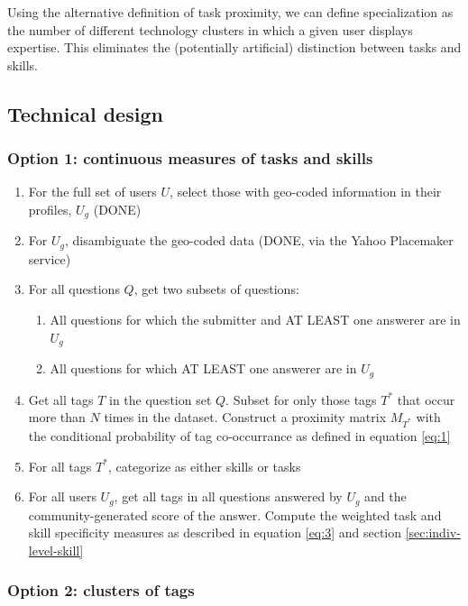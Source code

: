 \documentclass[11pt]{article}
\begin{document}
Using the alternative definition of task proximity, we can define
specialization as the number of different technology clusters in which
a given user displays expertise. This eliminates the (potentially
artificial) distinction between tasks and skills.

\subsection{Technical design}
\label{sec:technical-design}

\subsubsection{Option 1: continuous measures of tasks and skills}
\label{sec:option-1:-continuous}

\begin{enumerate}
\item For the full set of users $U$, select those with geo-coded
  information in their profiles, $U_g$ (DONE)
\item For $U_g$, disambiguate the geo-coded data (DONE, via the Yahoo
  Placemaker service)
\item For all questions $Q$, get two subsets of questions:
  \begin{enumerate}
  \item All questions for which the submitter and AT LEAST one
    answerer are in $U_g$
  \item All questions for which AT LEAST one answerer are in $U_g$
  \end{enumerate}
\item Get all tags $T$ in the question set $Q$. Subset for only those
  tags $T^*$ that occur more than $N$ times in the dataset. Construct a
  proximity matrix $M_{T^*}$ with the conditional probability of tag
  co-occurrance as defined in equation \ref{eq:1}
\item For all tags $T^*$, categorize as either skills or tasks
\item For all users $U_g$, get all tags in all questions answered by
  $U_g$ and the community-generated score of the answer. Compute the
  weighted task and skill specificity measures as described in
  equation \ref{eq:3} and section \ref{sec:indiv-level-skill}
\end{enumerate}

\subsubsection{Option 2: clusters of tags}
\label{sec:option-2:-clusters}
\end{document}
